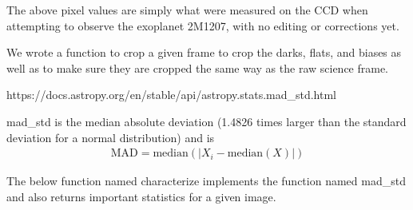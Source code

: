 \documentclass[11pt]{article}
\begin{document}
    The above pixel values are simply what were measured on the CCD when
attempting to observe the exoplanet 2M1207, with no editing or
corrections yet.

We wrote a function to crop a given frame to crop the darks, flats, and
biases as well as to make sure they are cropped the same way as the raw
science frame.

    https://docs.astropy.org/en/stable/api/astropy.stats.mad\_std.html

mad\_std is the median absolute deviation (1.4826 times larger than the
standard deviation for a normal distribution) and is \begin{align}
\text{MAD} = \text{median}(|X_i - \text{median}(X)|)
\end{align}

The below function named characterize implements the function named
mad\_std and also returns important statistics for a given image.
\end{document}
